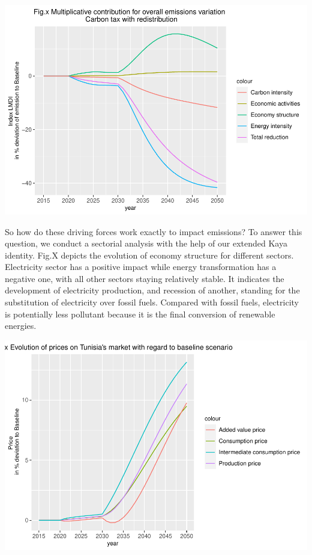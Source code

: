 \documentclass[
]{article}
\begin{document}
\begin{center}\includegraphics[width=0.7\linewidth,height=0.7\textheight]{Modele-ThreeMe-Tunisie_Sequeira_Valilou_Wang_files/figure-latex/unnamed-chunk-20-1} \end{center}

So how do these driving forces work exactly to impact emissions? To
answer this question, we conduct a sectorial analysis with the help of
our extended Kaya identity. Fig.X depicts the evolution of economy
structure for different sectors. Electricity sector has a positive
impact while energy transformation has a negative one, with all other
sectors staying relatively stable. It indicates the development of
electricity production, and recession of another, standing for the
substitution of electricity over fossil fuels. Compared with fossil
fuels, electricity is potentially less pollutant because it is the final
conversion of renewable energies.

\begin{center}\includegraphics[width=0.7\linewidth,height=0.7\textheight]{Modele-ThreeMe-Tunisie_Sequeira_Valilou_Wang_files/figure-latex/unnamed-chunk-21-1} \end{center}
\end{document}
